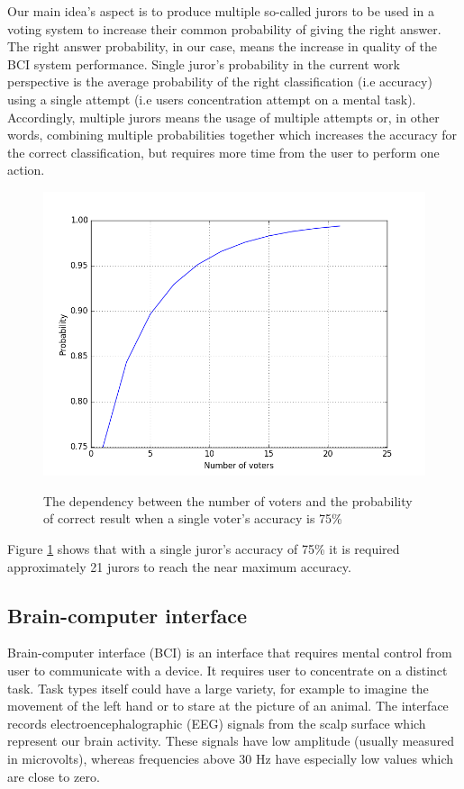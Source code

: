 \documentclass[12pt]{article}
\theoremstyle{definition}
\begin{document}
Our main idea's aspect is to produce multiple so-called jurors to be used in a voting system to increase their common probability of giving the right answer. The right answer probability, in our case, means the increase in quality of the BCI system performance. Single juror's probability in the current work perspective is the average probability of the right classification (i.e accuracy) using a single attempt (i.e users concentration attempt on a mental task). Accordingly, multiple jurors means the usage of multiple attempts or, in other words, combining multiple probabilities together which increases the accuracy for the correct classification, but requires more time from the user to perform one action.
\begin{figure} [H]
\begin{center}
\label{fig:condorcet123}
\includegraphics[width=1\textwidth]{condorcet}
\caption{The dependency between the number of voters and the probability of correct result when a single voter's accuracy is 75\%}
\end{center}
\end{figure}

Figure \ref{fig:condorcet123} shows that with a single juror's accuracy of 75\% it is required approximately 21 jurors to reach the near maximum accuracy.
\subsection{Brain-computer interface}

Brain-computer interface (BCI) is an interface that requires mental control from user to communicate with a device. It requires user to concentrate on a distinct task. Task types itself could have a large variety, for example to imagine the movement of the left hand or to stare at the picture of an animal. The interface records electroencephalographic (EEG) signals from the scalp surface which represent our brain activity. These signals have low amplitude (usually measured in microvolts), whereas frequencies above 30 Hz have especially low values which are close to zero. \cite{bci_vidal}
\end{document}

